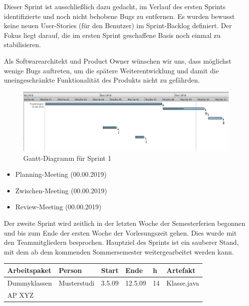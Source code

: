 Dieser Sprint ist ausschließlich dazu gedacht, im Verlauf des ersten Sprints identifizierte und noch nicht behobene Bugs zu entfernen. Es wurden bewusst keine neuen User-Stories (für den Benutzer) im Sprint-Backlog definiert. Der Fokus liegt darauf, die im ersten Sprint geschaffene Basis noch einmal zu stabilisieren.
\nsecend

Als Softwarearchitekt und Product Owner wünschen wir uns, dass möglichst wenige Bugs auftreten, um die spätere Weiterentwicklung und damit die uneingeschränkte Funktionalität des Produkts nicht zu gefährden.
\nsecend
\nsecend %

\begin{figure}[hbtp]
\centering
\includegraphics[width=\textwidth]{Bilder/gantt}
\caption{Gantt-Diagramm für Sprint 1}
\end{figure}
\nsecend%

\begin{itemize}
\item Planning-Meeting (00.00.2019)
\item Zwischen-Meeting (00.00.2019)
\item Review-Meeting (00.00.2019)
\end{itemize}
\nsecend%

Der zweite Sprint wird zeitlich in der letzten Woche der Semesterferien begonnen und bis zum Ende der ersten Woche der Vorlesungszeit gehen. Dies wurde mit den Teammitgliedern besprochen. Hauptziel des Sprints ist ein sauberer Stand, mit dem ab dem kommenden Sommersemester weitergearbeitet werden kann.
\nsecend

\begin{longtable}{|p{4cm}|l|l|l|l|l|}
        \hline
        Arbeitspaket & Person & Start & Ende & h & Artefakt\\
        \hline
        Dummyklassen & Musterstudi & 3.5.09 & 12.5.09 & 14 & Klasse.java\\ \hline
        AP XYZ &  &  &  & & \\ \hline
\end{longtable}     
\nsecend

